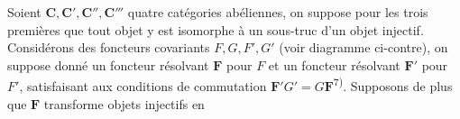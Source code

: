 
Soient $\mathbf C,\mathbf C',\mathbf C'',\mathbf C'''$ quatre catégories abéliennes, on suppose pour les trois
premières que tout objet y est isomorphe à un sous-truc d'un objet injectif.
Considérons des foncteurs covariants $F,G,F',G'$ (voir diagramme ci-contre),
on suppose donné un foncteur résolvant $\mathbf F$ pour $F$ et un foncteur
résolvant $\mathbf F'$ pour $F'$, satisfaisant aux conditions de commutation
$\mathbf F'G'=G\mathbf F$\textsuperscript{7)}. Supposons de plus que $\mathbf F$ transforme
objets injectifs en

